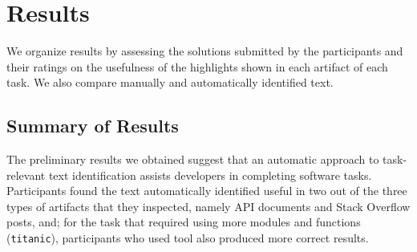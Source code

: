 
\section{Results}
\label{cp6:results}

We organize results by assessing the solutions submitted by the participants
and their ratings on the usefulness of the highlights shown 
in each artifact of each task. We also compare manually and automatically identified text.









\subsection{Summary of Results}


The preliminary results we obtained suggest that 
an automatic approach to task-relevant text identification
assists 
developers in completing software tasks. 
Participants  found the text automatically identified
useful in two out of the three types of artifacts that they inspected, 
namely API documents and Stack Overflow posts, and; 
for the task that required using more modules and functions (\texttt{titanic}),
participants who used \acs{tool} also produced more correct results.




